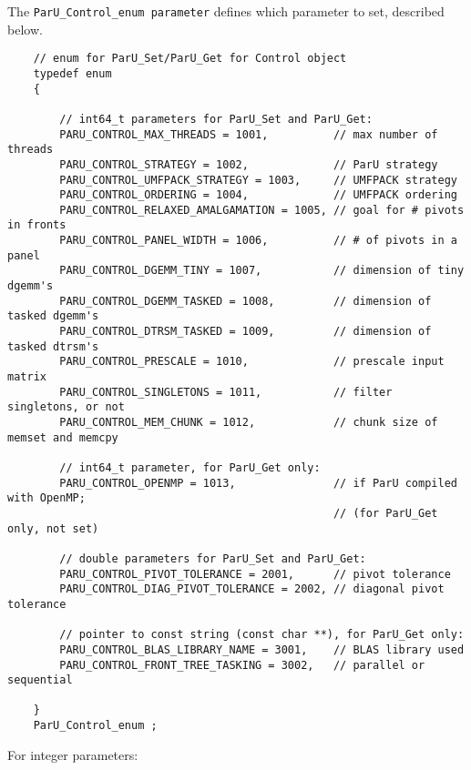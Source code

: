 \documentclass[12pt]{article}
\begin{document}
The \verb'ParU_Control_enum parameter' defines which parameter to set,
described below.

    {\footnotesize
    \begin{verbatim}
    // enum for ParU_Set/ParU_Get for Control object
    typedef enum
    {

        // int64_t parameters for ParU_Set and ParU_Get:
        PARU_CONTROL_MAX_THREADS = 1001,          // max number of threads
        PARU_CONTROL_STRATEGY = 1002,             // ParU strategy
        PARU_CONTROL_UMFPACK_STRATEGY = 1003,     // UMFPACK strategy
        PARU_CONTROL_ORDERING = 1004,             // UMFPACK ordering
        PARU_CONTROL_RELAXED_AMALGAMATION = 1005, // goal for # pivots in fronts
        PARU_CONTROL_PANEL_WIDTH = 1006,          // # of pivots in a panel
        PARU_CONTROL_DGEMM_TINY = 1007,           // dimension of tiny dgemm's
        PARU_CONTROL_DGEMM_TASKED = 1008,         // dimension of tasked dgemm's
        PARU_CONTROL_DTRSM_TASKED = 1009,         // dimension of tasked dtrsm's
        PARU_CONTROL_PRESCALE = 1010,             // prescale input matrix
        PARU_CONTROL_SINGLETONS = 1011,           // filter singletons, or not
        PARU_CONTROL_MEM_CHUNK = 1012,            // chunk size of memset and memcpy

        // int64_t parameter, for ParU_Get only:
        PARU_CONTROL_OPENMP = 1013,               // if ParU compiled with OpenMP;
                                                  // (for ParU_Get only, not set)

        // double parameters for ParU_Set and ParU_Get:
        PARU_CONTROL_PIVOT_TOLERANCE = 2001,      // pivot tolerance
        PARU_CONTROL_DIAG_PIVOT_TOLERANCE = 2002, // diagonal pivot tolerance

        // pointer to const string (const char **), for ParU_Get only:
        PARU_CONTROL_BLAS_LIBRARY_NAME = 3001,    // BLAS library used
        PARU_CONTROL_FRONT_TREE_TASKING = 3002,   // parallel or sequential

    }
    ParU_Control_enum ; \end{verbatim}}

    For integer parameters:
\end{document}
